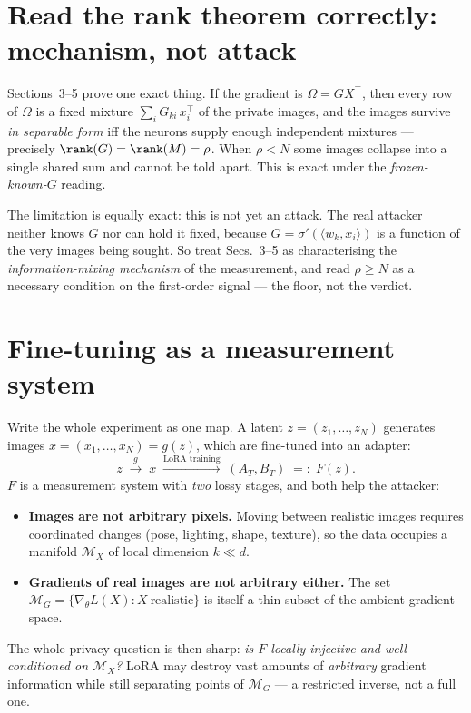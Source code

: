 \section{Read the rank theorem correctly: mechanism, not attack}
Sections~3--5 prove one exact thing. If the gradient is $\Omega=GX^{\top}$, then every
row of $\Omega$ is a fixed mixture $\sum_i G_{ki}\,x_i^{\top}$ of the private images, and
the images survive \emph{in separable form} iff the neurons supply enough independent
mixtures --- precisely $\rank(G)=\rank(M)=\rho$. When $\rho<N$ some images collapse into
a single shared sum and cannot be told apart. This is exact under the
\emph{frozen-known-$G$} reading.

The limitation is equally exact: this is not yet an attack. The real attacker neither
knows $G$ nor can hold it fixed, because $G=\sigma'(\langle w_k,x_i\rangle)$ is a
function of the very images being sought. So treat Secs.~3--5 as characterising the
\emph{information-mixing mechanism} of the measurement, and read $\rho\ge N$ as a
necessary condition on the first-order signal --- the floor, not the verdict.

\section{Fine-tuning as a measurement system}
Write the whole experiment as one map. A latent $z=(z_1,\dots,z_N)$ generates images
$x=(x_1,\dots,x_N)=g(z)$, which are fine-tuned into an adapter:
\[
z \;\xrightarrow{\;g\;}\; x \;\xrightarrow{\text{LoRA training}}\; (A_T,B_T)
\;=:\; F(z).
\]
$F$ is a measurement system with \emph{two} lossy stages, and both help the attacker:
\begin{itemize}\itemsep2pt
\item \textbf{Images are not arbitrary pixels.} Moving between realistic images requires
coordinated changes (pose, lighting, shape, texture), so the data occupies a manifold
$\mathcal M_X$ of local dimension $k\ll d$.
\item \textbf{Gradients of real images are not arbitrary either.} The set
$\mathcal M_G=\{\nabla_\theta L(X):X\ \text{realistic}\}$ is itself a thin subset of the
ambient gradient space.
\end{itemize}
The whole privacy question is then sharp: \emph{is $F$ locally injective and
well-conditioned on $\mathcal M_X$?} LoRA may destroy vast amounts of \emph{arbitrary}
gradient information while still separating points of $\mathcal M_G$ --- a restricted
inverse, not a full one.

